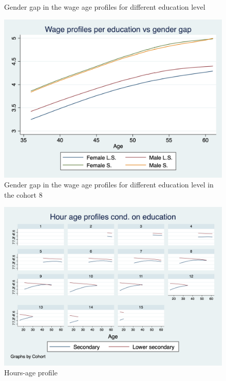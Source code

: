 \documentclass[12pt]{article}
\begin{document}
\begin{center}
\begin{figure}[!h]
    \caption{\label{fig:w_gend_l}Gender gap in the wage age profiles for different education level}
\end{figure}
\begin{figure}[!h]
    \includegraphics[scale=0.4]{graph2_1.png}
    \caption{\label{fig:w_gend_l_cohort8}Gender gap in the wage age profiles for different education level in the cohort
    8}
\end{figure}
\begin{figure}[!h]    
    \centering
    \includegraphics[scale=0.4]{graph4.png}
    \caption{\label{fig:hours}Hours-age profile}
\end{figure}
\begin{figure}[!h]

\end{figure}
\end{center}
\end{document}
